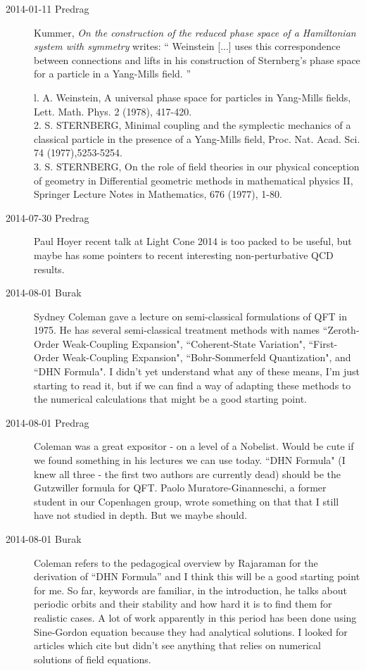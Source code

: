 \begin{description}
\item[2014-01-11 Predrag]
Kummer, {\em On the construction of the reduced phase space
of a {Hamiltonian} system with symmetry} writes:
``
Weinstein [...] uses this correspondence between connections
and lifts in his construction of Sternberg's phase space for a
particle in a Yang-Mills field.
''

l. A. Weinstein, A universal phase space for particles in Yang-Mills
fields, Lett. Math. Phys. 2 (1978), 417-420. \\
2. S. STERNBERG, Minimal coupling and the symplectic mechanics of a
classical particle in the presence of a Yang-Mills field, Proc. Nat.
Acad. Sci. 74 (1977),5253-5254. \\
3. S. STERNBERG, On the role of field theories in our physical conception
of geometry in Differential geometric methods in mathematical physics II,
Springer Lecture Notes in Mathematics,
676 (1977), 1-80. \\

\item[2014-07-30 Predrag]
Paul Hoyer recent talk at
{Light Cone 2014} is too packed to be useful, but maybe has some pointers
to recent interesting non-perturbative QCD results.

\item[2014-08-01 Burak]
Sydney Coleman gave a lecture on semi-classical formulations of QFT in 1975.
He has several semi-classical treatment methods with names
``Zeroth-Order Weak-Coupling Expansion",
``Coherent-State Variation",
``First-Order Weak-Coupling Expansion",
``Bohr-Sommerfeld Quantization", and
``DHN Formula". I didn't yet understand what any of these means, I'm just starting
to read it, but if we can find a way of adapting these methods to the numerical
calculations that might be a good starting point.

\item[2014-08-01 Predrag]
Coleman was a great expositor - on a level of a Nobelist. Would be cute
if we found something in his lectures we can use today. ``DHN Formula" (I
knew all three - the first two authors are currently dead) should be the
Gutzwiller formula for QFT. Paolo Muratore-Ginanneschi, a former student
in our Copenhagen group, wrote something on that that I still
have not studied in depth. But we maybe should.

\item[2014-08-01 Burak]
Coleman refers to the pedagogical overview by Rajaraman for the derivation
of ``DHN Formula'' and I think this will be a good starting point for me. So far,
keywords are familiar, in the introduction, he talks about periodic orbits and
their stability and how hard it is to find them for realistic cases. A lot of work
apparently in this period has been done using Sine-Gordon equation because they
had analytical solutions. I looked for articles which cite  but didn't
see anything that relies on numerical solutions of field equations.


\end{description}

